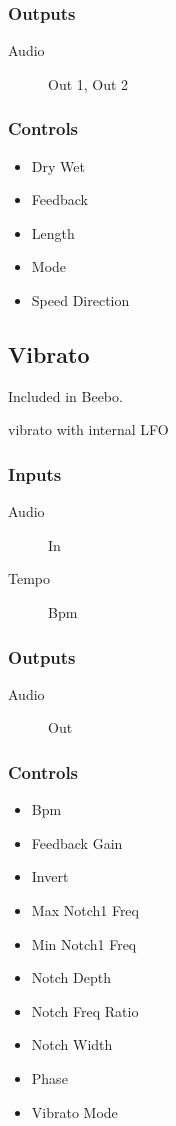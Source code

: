 \subsubsection{Outputs}
\begin{description}
\item [Audio] Out 1, Out 2
\end{description}

\subsubsection{Controls}
\begin{itemize}
\item Dry Wet
\item Feedback
\item Length
\item Mode
\item Speed Direction
\end{itemize}

\subsection{Vibrato}

Included in Beebo.

vibrato with internal LFO



\subsubsection{Inputs}
\begin{description}
\item [Audio] In
\item [Tempo] Bpm
\end{description}

\subsubsection{Outputs}
\begin{description}
\item [Audio] Out
\end{description}

\subsubsection{Controls}
\begin{itemize}
\item Bpm
\item Feedback Gain
\item Invert
\item Max Notch1 Freq
\item Min Notch1 Freq
\item Notch Depth
\item Notch Freq Ratio
\item Notch Width
\item Phase
\item Vibrato Mode
\end{itemize}

